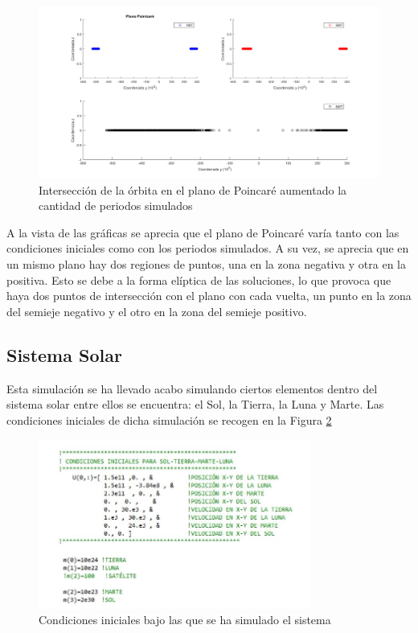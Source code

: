 \documentclass[11pt,singlespacing,liststotoc,headsepline,a4paper]{article}
\begin{document}
\begin{figure}[H]
	\centering
	\includegraphics[width=1\textwidth]{PointCareT_2.png}
	\caption{Intersección de la órbita en el plano de Poincaré aumentado la cantidad de periodos simulados}
	\label{PointCareT_2}
\end{figure}


A la vista de las gráficas se aprecia que el plano de Poincaré varía tanto con las condiciones iniciales como con los periodos simulados. A su vez, se aprecia que en un mismo plano hay dos regiones de puntos, una en la zona negativa y otra en la positiva. Esto se debe a la forma elíptica de las soluciones, lo que provoca que haya dos puntos de intersección con el plano con cada vuelta, un punto en la zona del semieje negativo y el otro en la zona del semieje positivo.

\newpage
\subsection{Sistema Solar}
 
Esta simulación se ha llevado acabo simulando ciertos elementos dentro del sistema solar entre ellos se encuentra: el Sol, la Tierra, la Luna y Marte. Las condiciones iniciales de dicha simulación se recogen en la Figura \ref{TLMS_CI}

\begin{figure}[H]
	\centering
	\includegraphics[width=0.8\textwidth]{TLMS_CI.jpg}
	\caption{Condiciones iniciales bajo las que se ha simulado el sistema}
	\label{TLMS_CI}
\end{figure}
\end{document}
